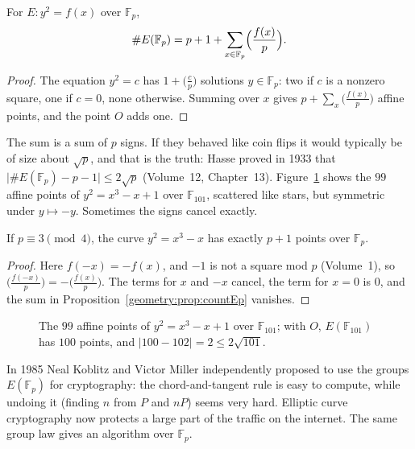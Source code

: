 \begin{proposition}\label{geometry:prop:countEp}
For $E:y^2=f(x)$ over $\mathbb F_p$,
\[
\# E(\mathbb F_p)=p+1+\sum_{x\in\mathbb F_p}\Bigl(\frac{f(x)}p\Bigr).
\]
\end{proposition}

\begin{proof}
The equation $y^2=c$ has $1+\bigl(\frac cp\bigr)$ solutions $y\in\mathbb F_p$: two if $c$ is a nonzero square, one if $c=0$, none otherwise. Summing over $x$
gives $p+\sum_x\bigl(\frac{f(x)}p\bigr)$ affine points, and the point $O$ adds one.
\end{proof}

The sum is a sum of $p$ signs. If they behaved like coin flips it would typically be of size about $\sqrt p$, and that is the truth: Hasse proved in 1933
that $\bigl|\#E(\mathbb F_p)-p-1\bigr|\le2\sqrt p$ (Volume~12, Chapter~13). Figure~\ref{geometry:fig:finitecubic} shows the $99$ affine points of $y^2=x^3-x+1$ over
$\mathbb F_{101}$, scattered like stars, but symmetric under $y\mapsto-y$. Sometimes the signs cancel exactly.

\begin{proposition}\label{geometry:prop:supersingular}
If $p\equiv3\pmod4$, the curve $y^2=x^3-x$ has exactly $p+1$ points over $\mathbb F_p$.
\end{proposition}

\begin{proof}
Here $f(-x)=-f(x)$, and $-1$ is not a square mod $p$ (Volume~1), so $\bigl(\frac{f(-x)}p\bigr)=-\bigl(\frac{f(x)}p\bigr)$. The terms for $x$ and $-x$ cancel,
the term for $x=0$ is $0$, and the sum in Proposition~\ref{geometry:prop:countEp} vanishes.
\end{proof}

\begin{figure}[ht]
\centering
{}
\caption{The $99$ affine points of $y^2=x^3-x+1$ over $\mathbb F_{101}$; with $O$, $E(\mathbb F_{101})$ has $100$ points, and $|100-102|=2\le2\sqrt{101}$.}
\label{geometry:fig:finitecubic}
\end{figure}

\begin{remark}
In 1985 Neal Koblitz and Victor Miller independently proposed to use the groups $E(\mathbb F_p)$ for cryptography: the chord-and-tangent rule is easy to
compute, while undoing it (finding $n$ from $P$ and $nP$) seems very hard. Elliptic curve cryptography now protects a large part of the traffic on the
internet. The same group law gives an algorithm over $\mathbb F_p$.
\end{remark}

